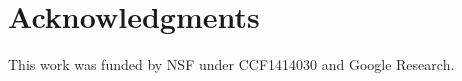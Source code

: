 \documentclass[11pt,a4paper]{article}
\begin{document}


\section*{Acknowledgments}
This work was funded by NSF under CCF1414030 and Google Research.




\appendix

\vspace{-0.05in}
\end{document}
